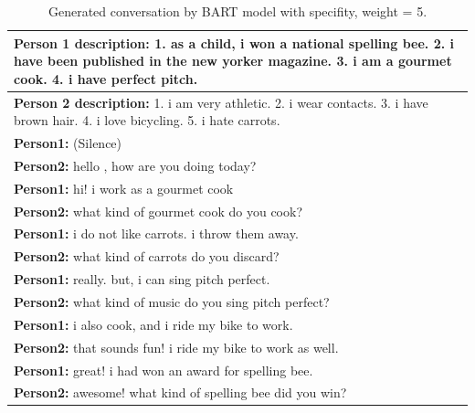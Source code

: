 \begin{table}[ht]
 \begin{tabular}{|p{14cm}|}
 \hline
 \textbf{Person 1 description:} 1. as a child, i won a national spelling bee. 2. i have been published in the new yorker magazine. 3. i am a gourmet cook. 4. i have perfect pitch. \\
 \hline
 \textbf{Person 2 description:} 1. i am very athletic. 2. i wear contacts. 3. i have brown hair. 4. i love bicycling. 5. i hate carrots. \\
 \hline
 \textbf{Person1:} (Silence) \\
 \textbf{Person2:} hello , how are you doing today? \\ 
 \textbf{Person1:} hi! i work as a gourmet cook \\
 \textbf{Person2:} what kind of gourmet cook do you cook?\\
 \textbf{Person1:} i do not like carrots. i throw them away.\\
 \textbf{Person2:} what kind of carrots do you discard? \\
 \textbf{Person1:} really. but, i can sing pitch perfect.\\
 \textbf{Person2:} what kind of music do you sing pitch perfect?\\
 \textbf{Person1:} i also cook, and i ride my bike to work.\\
 \textbf{Person2:} that sounds fun! i ride my bike to work as well. \\
 \textbf{Person1:} great! i had won an award for spelling bee. \\
 \textbf{Person2:} awesome! what kind of spelling bee did you win?\\
 \hline
 \end{tabular}
\caption{Generated conversation by BART model with specifity, weight = 5.}
\label{tab:bart_nidf}
\end{table}


